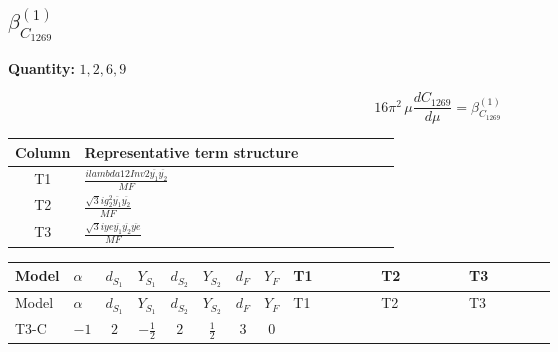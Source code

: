 \documentclass[8pt]{article}
\begin{document}
\begin{landscape}
\section*{$\beta_{C_{1269}}^{(1)}$}
\noindent\textbf{Quantity: }$\mathrm{1,2,6,9}$\par\smallskip
\[16\pi^2\,\mu\frac{d C_{1269}}{d\mu}=\beta_{C_{1269}}^{(1)}\]
\begin{center}
\begin{tabular}{@{}c >{\raggedright\arraybackslash}p{0.82\linewidth}@{}}
\toprule
Column & Representative term structure \\
\midrule
T1 & \(\displaystyle \frac{i lambda12Inv2 \overline{y_{1}} \overline{y_{2}}}{MF}\) \\
\midrule
T2 & \(\displaystyle \frac{\sqrt{3} i g_{2}^{2} \overline{y_{1}} \overline{y_{2}}}{MF}\) \\
\midrule
T3 & \(\displaystyle \frac{\sqrt{3} i ye \overline{y_{1}} \overline{y_{2}} \overline{ye}}{MF}\) \\
\midrule
\bottomrule
\end{tabular}
\end{center}
\smallskip
\tiny
\begin{longtable}{@{}llcccccc >{\raggedright\arraybackslash}p{0.21\linewidth} >{\raggedright\arraybackslash}p{0.21\linewidth} >{\raggedright\arraybackslash}p{0.21\linewidth}@{}}
\toprule
Model & $\alpha$ & $d_{S_1}$ & $Y_{S_1}$ & $d_{S_2}$ & $Y_{S_2}$ & $d_F$ & $Y_F$ & T1 & T2 & T3 \\
\midrule
\endfirsthead
\toprule
Model & $\alpha$ & $d_{S_1}$ & $Y_{S_1}$ & $d_{S_2}$ & $Y_{S_2}$ & $d_F$ & $Y_F$ & T1 & T2 & T3 \\
\midrule
\endhead
T3-C & $-1$ & $2$ & $-\frac{1}{2}$ & $2$ & $\frac{1}{2}$ & $3$ & $0$ & \scriptsize\adjustbox{max width=\linewidth}{$\begin{gathered} \frac{i lambda12Inv2 \overline{y_{1}} \overline{y_{2}}}{6 MF}\end{gathered}$} & \scriptsize\adjustbox{max width=\linewidth}{$\begin{gathered} \frac{\sqrt{3} i g_{2}^{2} \overline{y_{1}} \overline{y_{2}}}{8 MF}\end{gathered}$} & \scriptsize\adjustbox{max width=\linewidth}{$\begin{gathered} - \frac{\sqrt{3} i ye \overline{y_{1}} \overline{y_{2}} \overline{ye}}{24 MF}\end{gathered}$} \\
\midrule
\bottomrule
\end{longtable}
\clearpage

\end{landscape}
\end{document}
